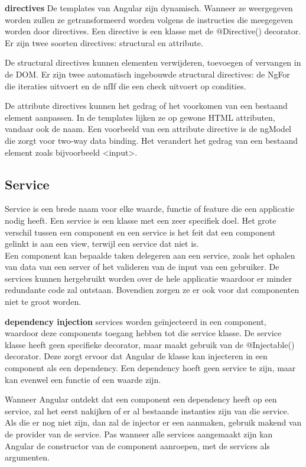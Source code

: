 \textbf{directives} \hspace{1cm} De templates van Angular zijn dynamisch. Wanneer ze weergegeven worden zullen ze getransformeerd worden volgens de instructies die meegegeven worden door directives. Een directive is een klasse met de @Directive() decorator. Er zijn twee soorten directives: structural en attribute. 

De structural directives kunnen elementen verwijderen, toevoegen of vervangen in de DOM. Er zijn twee automatisch ingebouwde structural directives: de NgFor die iteraties uitvoert en de nfIf die een check uitvoert op condities.

De attribute directives kunnen het gedrag of het voorkomen van een bestaand element aanpassen. In de templates lijken ze op gewone HTML attributen, vandaar ook de naam. 
Een voorbeeld van een attribute directive is de ngModel die zorgt voor two-way data binding. Het verandert het gedrag van een bestaand element zoals bijvoorbeeld <input>. 

\subsection{Service}
Service is een brede naam voor elke waarde, functie of feature die een applicatie nodig heeft. Een service is een klasse met een zeer specifiek doel. Het grote verschil tussen een component en een service is het feit dat een component gelinkt is aan een view, terwijl een service dat niet is. \\
Een component kan bepaalde taken delegeren aan een service, zoals het ophalen van data van een server of het valideren van de input van een gebruiker. De services kunnen hergebruikt worden over de hele applicatie waardoor er minder redundante code zal ontstaan. Bovendien zorgen ze er ook voor dat componenten niet te groot worden. 

\textbf{dependency injection} \hspace{1cm} services worden geïnjecteerd in een component, waardoor deze components toegang hebben tot die service klasse. De service klasse heeft geen specifieke decorator, maar maakt gebruik van de @Injectable() decorator. Deze zorgt ervoor dat Angular de klasse kan injecteren in een component als een dependency. Een dependency hoeft geen service te zijn, maar kan evenwel een functie of een waarde zijn. 

Wanneer Angular ontdekt dat een component een dependency heeft op een service, zal het eerst nakijken of er al bestaande instanties zijn van die service. Als die er nog niet zijn, dan zal de injector er een aanmaken, gebruik makend van de provider van de service. Pas wanneer alle services aangemaakt zijn kan Angular de constructor van de component aanroepen, met de services als argumenten. 


